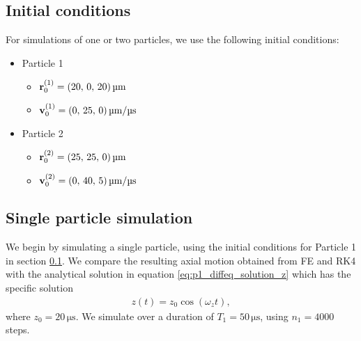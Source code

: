 \subsection{Initial conditions}\label{sec:initial_conditions}
For simulations of one or two particles, we use the following initial conditions:
\begin{itemize}
    \item Particle 1\label{item:initial_conditions_p1}
    \begin{itemize}
        \item[] $\vec{r}^{(1)}_0 = (20, \,0, \,20) \, \mathrm{\text{\textmu}m} $
        \item[] $\vec{v}^{(1)}_0 = (0,\,25,\,0) \, \mathrm{\text{\textmu}m}/ \mathrm{\text{\textmu}s}$
    \end{itemize}
    \item Particle 2\label{item:initial_conditions_p2}
    \begin{itemize}
        \item[] $\vec{r}^{(2)}_0 = (25, \,25, \,0) \, \mathrm{\text{\textmu}m} $
        \item[] $\vec{v}^{(2)}_0 = (0,\,40,\,5) \, \mathrm{\text{\textmu}m}/ \mathrm{\text{\textmu}s}$
    \end{itemize}
\end{itemize}



\subsection{Single particle simulation}\label{sec:simulation}
We begin by simulating a single particle, using the initial conditions for Particle 1 in section \ref{sec:initial_conditions}. We compare the resulting axial motion obtained from FE and RK4 with the analytical solution in equation \eqref{eq:p1_diffeq_solution_z} which has the specific solution 
\begin{align}
    z(t) = z_0 \cos(\omega_z t), \label{eq:z_spec_analytical_solution}
\end{align}
where $z_0=20\,\mathrm{\mu s}$. We simulate over a duration of $T_1=50\,\mathrm{\mu s}$, using $n_1=4000$ steps. 

